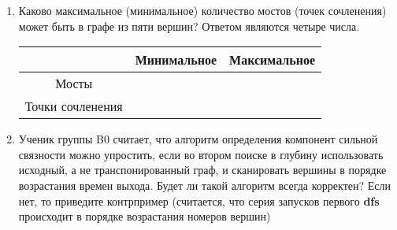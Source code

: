 \documentclass[a4paper,10pt]{article}
\begin{document}
\begin{enumerate}
      \vskip 4cm

     \item
       Каково максимальное (минимальное) количество мостов (точек сочленения)
       может быть в графе из пяти вершин? Ответом являются четыре числа.
      
      \begin{center}
        \begin{tabular}{|c|c|c|}
          \hline
           & Минимальное & Максимальное \\
          \hline
          Мосты & & \\
          \hline
          Точки сочленения & & \\
          \hline
        \end{tabular}
      \end{center}

     \item
       Ученик группы B0 считает, что алгоритм определения компонент сильной связности
       можно упростить, если во втором поиске в глубину использовать исходный,
       а не транспонированный граф, и сканировать вершины в порядке возрастания времен
       выхода. Будет ли такой алгоритм всегда корректен? Если нет, то приведите контрпример (считается, что серия запусков первого \textbf{dfs} происходит в порядке возрастания номеров вершин)

  \end{enumerate}
\end{document}
